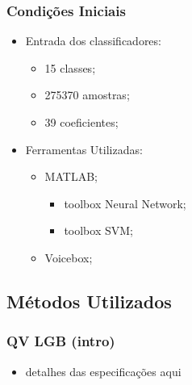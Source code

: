 \documentclass{beamer}
\begin{document}
\begin{frame}
	\frametitle{Condições Iniciais}
	
    \begin{itemize}
    	\setlength\itemsep{1em}
    	\item Entrada dos classificadores:
        \begin{itemize}
    	    \item 15 classes;
            \item 275370 amostras;
            \item 39 coeficientes;
        \end{itemize}
    	
        \item Ferramentas Utilizadas:
        \begin{itemize}
			\item MATLAB;
        	\begin{itemize}
        		\item toolbox Neural Network;
        		\item toolbox SVM;
        	\end{itemize}
        	\item Voicebox;
		\end{itemize}
	\end{itemize}
\end{frame}




\subsection{Métodos Utilizados}


\begin{frame}

	\frametitle{QV LGB (intro)}
	
	\begin{itemize}	
		\item detalhes das especificações aqui
	\end{itemize}
	
\end{frame}
\end{document}
